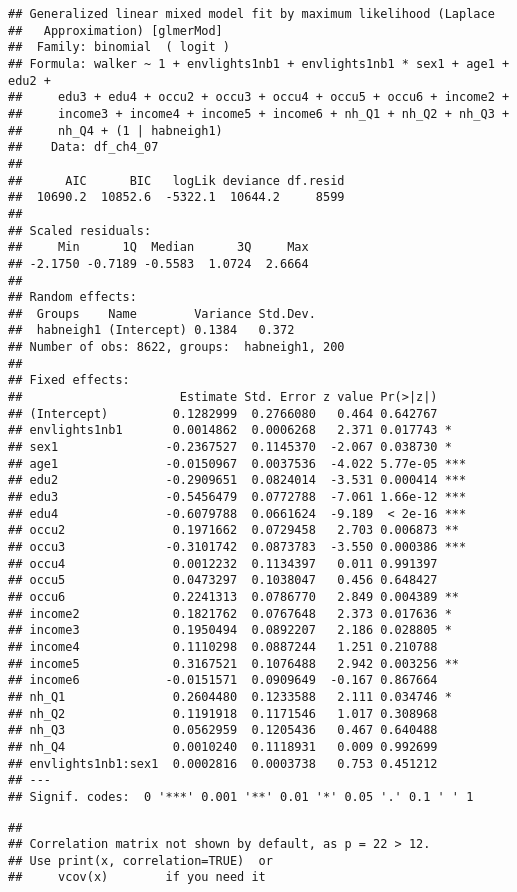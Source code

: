 \documentclass[
]{book}
\begin{document}
\begin{verbatim}
## Generalized linear mixed model fit by maximum likelihood (Laplace
##   Approximation) [glmerMod]
##  Family: binomial  ( logit )
## Formula: walker ~ 1 + envlights1nb1 + envlights1nb1 * sex1 + age1 + edu2 +  
##     edu3 + edu4 + occu2 + occu3 + occu4 + occu5 + occu6 + income2 +  
##     income3 + income4 + income5 + income6 + nh_Q1 + nh_Q2 + nh_Q3 +  
##     nh_Q4 + (1 | habneigh1)
##    Data: df_ch4_07
## 
##      AIC      BIC   logLik deviance df.resid 
##  10690.2  10852.6  -5322.1  10644.2     8599 
## 
## Scaled residuals: 
##     Min      1Q  Median      3Q     Max 
## -2.1750 -0.7189 -0.5583  1.0724  2.6664 
## 
## Random effects:
##  Groups    Name        Variance Std.Dev.
##  habneigh1 (Intercept) 0.1384   0.372   
## Number of obs: 8622, groups:  habneigh1, 200
## 
## Fixed effects:
##                      Estimate Std. Error z value Pr(>|z|)    
## (Intercept)         0.1282999  0.2766080   0.464 0.642767    
## envlights1nb1       0.0014862  0.0006268   2.371 0.017743 *  
## sex1               -0.2367527  0.1145370  -2.067 0.038730 *  
## age1               -0.0150967  0.0037536  -4.022 5.77e-05 ***
## edu2               -0.2909651  0.0824014  -3.531 0.000414 ***
## edu3               -0.5456479  0.0772788  -7.061 1.66e-12 ***
## edu4               -0.6079788  0.0661624  -9.189  < 2e-16 ***
## occu2               0.1971662  0.0729458   2.703 0.006873 ** 
## occu3              -0.3101742  0.0873783  -3.550 0.000386 ***
## occu4               0.0012232  0.1134397   0.011 0.991397    
## occu5               0.0473297  0.1038047   0.456 0.648427    
## occu6               0.2241313  0.0786770   2.849 0.004389 ** 
## income2             0.1821762  0.0767648   2.373 0.017636 *  
## income3             0.1950494  0.0892207   2.186 0.028805 *  
## income4             0.1110298  0.0887244   1.251 0.210788    
## income5             0.3167521  0.1076488   2.942 0.003256 ** 
## income6            -0.0151571  0.0909649  -0.167 0.867664    
## nh_Q1               0.2604480  0.1233588   2.111 0.034746 *  
## nh_Q2               0.1191918  0.1171546   1.017 0.308968    
## nh_Q3               0.0562959  0.1205436   0.467 0.640488    
## nh_Q4               0.0010240  0.1118931   0.009 0.992699    
## envlights1nb1:sex1  0.0002816  0.0003738   0.753 0.451212    
## ---
## Signif. codes:  0 '***' 0.001 '**' 0.01 '*' 0.05 '.' 0.1 ' ' 1
\end{verbatim}

\begin{verbatim}
## 
## Correlation matrix not shown by default, as p = 22 > 12.
## Use print(x, correlation=TRUE)  or
##     vcov(x)        if you need it
\end{verbatim}
\end{document}
